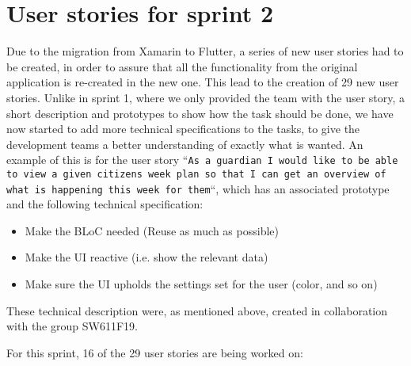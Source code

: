 \section{User stories for sprint 2}
Due to the migration from Xamarin to Flutter, a series of new user stories had to be created, in order to assure that all the functionality from the original application is re-created in the new one.
This lead to the creation of 29 new user stories.
Unlike in sprint 1, where we only provided the team with the user story, a short description and prototypes to show how the task should be done, we have now started to add more technical specifications to the tasks, to give the development teams a better understanding of exactly what is wanted.
An example of this is for the user story ``\texttt{As a guardian I would like to be able to view a given citizens week plan so that I can get an overview of what is happening this week for them}``, which has an associated prototype and the following technical specification:

\begin{itemize}
    \item Make the BLoC needed (Reuse as much as possible)
    \item Make the UI reactive (i.e. show the relevant data)
    \item Make sure the UI upholds the settings set for the user (color, and so on)
\end{itemize}
These technical description were, as mentioned above, created in collaboration with the group SW611F19.

\noindent
For this sprint, 16 of the 29 user stories are being worked on:

